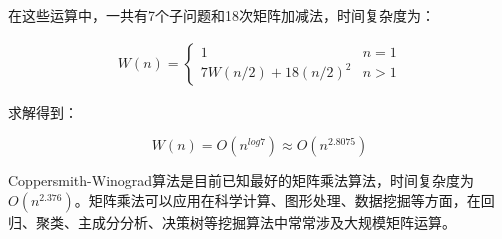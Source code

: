 在这些运算中，一共有7个子问题和18次矩阵加减法，时间复杂度为：

\vspace{-1cm}

\begin{align*}
	W(n) = \begin{cases}
		1                   & n = 1 \\
		7W(n/2) + 18(n/2)^2 & n > 1
	\end{cases}
\end{align*}

求解得到：

\vspace{-0.5cm}

$$
	W(n) = O(n^{log7}) \approx O(n^{2.8075})
$$

Coppersmith-Winograd算法是目前已知最好的矩阵乘法算法，时间复杂度为$ O(n^{2.376}) $。矩阵乘法可以应用在科学计算、图形处理、数据挖掘等方面，在回归、聚类、主成分分析、决策树等挖掘算法中常常涉及大规模矩阵运算。

\newpage